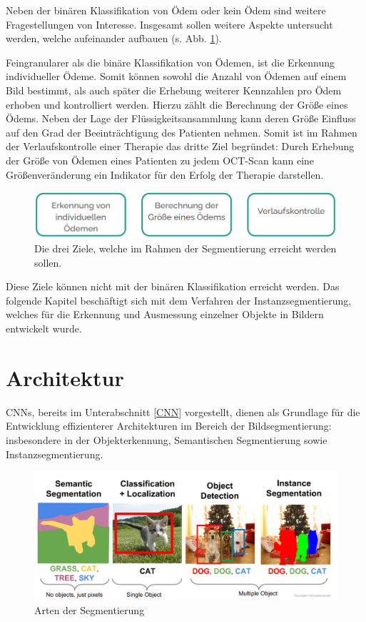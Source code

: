Neben der binären Klassifikation von Ödem oder kein Ödem sind weitere Fragestellungen von Interesse. Insgesamt sollen weitere Aspekte 
untersucht werden, welche aufeinander aufbauen (s. Abb. \ref{fig:ziel_segmentierung}).

Feingranularer als die binäre Klassifikation von Ödemen, ist die Erkennung individueller Ödeme. Somit können sowohl die Anzahl von Ödemen auf einem Bild bestimmt, als auch später die Erhebung weiterer Kennzahlen pro Ödem erhoben und kontrolliert werden.
Hierzu zählt die Berechnung der Größe eines Ödems. Neben der Lage der Flüssigkeitsansammlung kann deren Größe Einfluss auf den Grad der Beeinträchtigung des Patienten nehmen. Somit ist im Rahmen der Verlaufskontrolle einer Therapie das dritte Ziel begründet: Durch Erhebung der Größe von Ödemen eines Patienten zu jedem OCT-Scan kann eine Größenveränderung ein Indikator für den Erfolg der Therapie darstellen.\newline
\begin{figure}[ht!]
\centering
\includegraphics[width=0.7\linewidth]{./pic/Segmentierung/ziel_segmentierung.png}
\caption{\label{fig:ziel_segmentierung}Die drei Ziele, welche im Rahmen der Segmentierung erreicht werden sollen.}
\end{figure}

Diese Ziele können nicht mit der binären Klassifikation erreicht werden. Das folgende Kapitel beschäftigt sich mit dem Verfahren der Instanzsegmentierung, welches für die Erkennung und Ausmessung einzelner Objekte in Bildern entwickelt wurde. 



\section{Architektur}

CNNs, bereits im Unterabschnitt \ref{CNN} vorgestellt, dienen als Grundlage für die Entwicklung effizienterer Architekturen im Bereich der Bildsegmentierung: insbesondere in der Objekterkennung, Semantischen Segmentierung  sowie Instanzsegmentierung.  

\begin{figure}[H]
\centering
\includegraphics[width=0.7\linewidth]{pic/Segmentierung/segmentation_catsndogs.png}
\caption{\label{pic:catsndogs} Arten der Segmentierung}
\end{figure}


